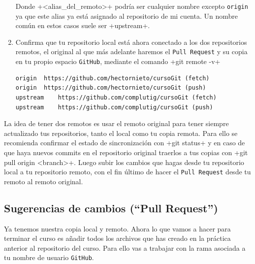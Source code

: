 \documentclass[a5paper,10pt]{article}
\begin{document}
\begin{enumerate}
   Donde \cverb+<alias_del_remoto>+ podría ser cualquier nombre excepto \verb+origin+ ya que este alias ya está asignado al repositorio de mi cuenta. Un nombre común en estos casos suele ser \cverb+upstream+.
   
   \item Confirma que tu repositorio local está ahora conectado a los dos repositorios remotos, el original al que más adelante haremos el \verb+Pull Request+ y su copia en tu propio espacio \verb+GitHub+, mediante el comando \cverb+git remote -v+
  
    \begin{lstlisting}[style=custom]   
origin	https://github.com/hectornieto/cursoGit (fetch)
origin	https://github.com/hectornieto/cursoGit (push)
upstream	https://github.com/complutig/cursoGit (fetch)
upstream	https://github.com/complutig/cursoGit (push)
    \end{lstlisting}
    \end{enumerate}
    
    La idea de tener dos remotos es usar el remoto original para tener siempre actualizado tus repositorios, tanto el  local como tu copia remota. Para ello se recomienda confirmar el estado de sincronización con \cverb+git status+ y en caso de que haya nuevos commits en el repositorio original traerlos a tus copias con \cverb+git pull origin <branch>+. Luego subir los cambios que hagas desde tu repositorio local a tu repositorio remoto, con el fin último de hacer el \verb+Pull Request+ desde tu remoto al remoto original.

    \subsection{Sugerencias de cambios (``Pull Request'')}
    Ya tenemos nuestra copia local y remoto. Ahora lo que vamos a hacer para terminar el curso es añadir todos los archivos que has creado en la práctica anterior al repositorio del curso. Para ello vas a trabajar con la rama asociada a tu nombre de usuario \verb+GitHub+.
    
\end{document}
